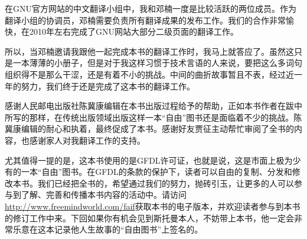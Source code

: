 在GNU官方网站的中文翻译小组中，我和邓楠一度是比较活跃的两位成员。作为翻译小组的协调员，邓楠需要负责所有翻译成果的发布工作。我们的合作非常愉快，在2010年左右完成了GNU网站大部分二级页面的翻译工作。

所以，当邓楠邀请我跟他一起完成本书的翻译工作时，我马上就答应了。虽然这只是一本薄薄的小册子，但是对于我这样习惯于技术言语的人来说，要把这么多词句组织得不是那么干涩，还是有着不小的挑战。中间的曲折故事暂且不表，经过近一年的努力，我们终于还是完成了这本书的翻译工作。

感谢人民邮电出版社陈冀康编辑在本书出版过程给予的帮助，正如本书作者在跋中所写的那样，在传统出版领域出版这样一本``自由''图书还是面临着不少的挑战。陈冀康编辑的耐心和执着，最终促成了本书。感谢好友贾征主动帮忙审阅了全书的内容，也感谢家人对我翻译工作的支持。

尤其值得一提的是，这本书使用的是GFDL许可证，也就是说，这是市面上极为少有的一本``自由''图书。在GFDL的条款的保护下，读者可以自由的复制、分发和修改本书。我们已经把全书的，希望通过我们的努力，抛砖引玉，让更多的人可以参与到了解、完善和传播本书内容的活动中。请访问\url{http://www.freemindworld.com/faif}获取本书的电子版本，并欢迎读者参与到本书的修订工作中来。下回如果你有机会见到斯托曼本人，不妨带上本书，他一定会非常乐意在这本记录他人生故事的``自由图书''上签名的。







